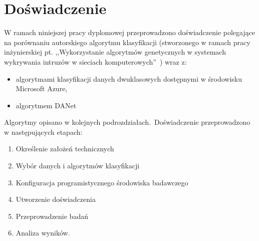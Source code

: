 \chapter{Doświadczenie}
\label{cha:dos}
W ramach niniejszej pracy dyplomowej przeprowadzono doświadczenie polegające na porównaniu autorskiego algorytmu klasyfikacji (stworzonego w ramach pracy inżynierskiej pt. ,,Wykorzystanie algorytmów genetycznych w systemach wykrywania intruzów w sieciach komputerowych''~\cite{Blyszcz2022}) wraz z:
\begin{itemize}
    \item algorytmami klasyfikacji danych dwuklasowych dostępnymi w środowisku Microsoft Azure,
    \item algorytmem DANet~\cite{Danet, Chen2022}
\end{itemize}
Algorytmy opisano w kolejnych podrozdziałach.\ Doświadczenie przeprowadzono w następujących etapach:
\begin{enumerate}
    \item Określenie założeń technicznych
    \item Wybór danych i algorytmów klasyfikacji
    \item Konfiguracja programistycznego środowiska badawczego
    \item Utworzenie doświadczenia
    \item Przeprowadzenie badań
    \item Analiza wyników.
\end{enumerate}


